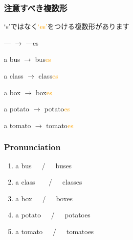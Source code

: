 \documentclass[aspectratio=169,xcolor={dvipsnames,table}]{beamer}
\newcommand{\myaudio}[1]{\href{#1}{\faVolumeUp}}
\begin{document}
\begin{frame}[plain]\frametitle{注意すべき複数形}

{\Large `s'ではなく\textcolor{orange}{`es'}をつける複数形があります}
\pause

\bigskip

\begin{block}{--- $\rightarrow$ ---es}

a bus \pause$\longrightarrow$ bus\textcolor{orange}{es}\pause%
\hfill{}\hspace*{250pt}\pause

a class \pause$\longrightarrow$ class\textcolor{orange}{es}\pause
\hfill{}\hspace*{250pt}\pause

a box \pause $\longrightarrow$ box\textcolor{orange}{es}\pause
\hfill{}\hspace*{250pt}\pause

a potato \pause$\longrightarrow$ potato\textcolor{orange}{es}\pause
\hfill{}\hspace*{250pt}\pause

a tomato \pause$\longrightarrow$ tomato\textcolor{orange}{es}\pause
\hfill{}\hspace*{250pt}


\end{block}
\end{frame}
\begin{frame}[plain]\frametitle{Pronunciation}

\begin{enumerate}
 \item a bus~~~\pause{}/~~~buses\pause%
\hfill{}\hspace{180pt}\mbox{} \item a class~~~~\pause{}/~~~classes\pause%
\hfill{}\hspace{180pt}\mbox{}
 \item a box~~~\pause{}/~~~boxes\pause%
\hfill{}\hspace{180pt}\mbox{}
 \item a potato~~~\pause{}/~~~potatoes\pause%
\hfill{}\hspace{180pt}\mbox{} \item a tomato~~~\pause{}/~~~tomatoes%
\hfill{}\hspace{180pt}\mbox{}

 \end{enumerate}


\bigskip

\bigskip

\mbox{}\hfill\myaudio{./audio/005_singular_plural_07.mp3}
\end{frame}
\end{document}
